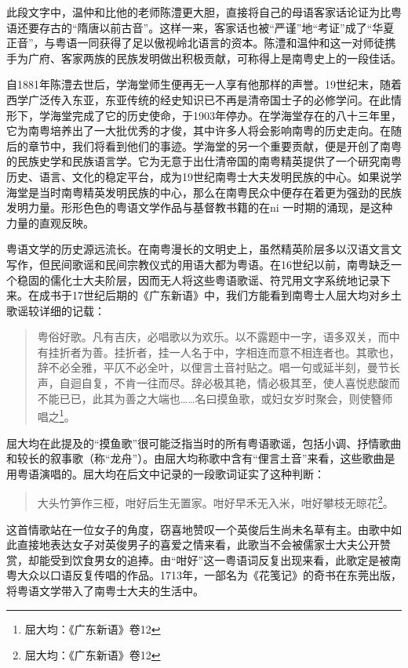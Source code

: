 此段文字中，温仲和比他的老师陈澧更大胆，直接将自己的母语客家话论证为比粤语还要存古的“隋唐以前古音”。这样一来，客家话也被“严谨”地“考证”成了“华夏正音”，与粤语一同获得了足以傲视岭北语言的资本。陈澧和温仲和这一对师徒携手为广府、客家两族的民族发明做出积极贡献，可称得上是南粤史上的一段佳话。

自1881年陈澧去世后，学海堂师生便再无一人享有他那样的声誉。19世纪末，随着西学广泛传入东亚，东亚传统的经史知识已不再是清帝国士子的必修学问。在此情形下，学海堂完成了它的历史使命，于1903年停办。在学海堂存在的八十三年里，它为南粤培养出了一大批优秀的才俊，其中许多人将会影响南粤的历史走向。在随后的章节中，我们将看到他们的事迹。学海堂的另一个重要贡献，便是开创了南粤的民族史学和民族语言学。它为无意于出仕清帝国的南粤精英提供了一个研究南粤历史、语言、文化的稳定平台，成为19世纪南粤士大夫发明民族的中心。如果说学海堂是当时南粤精英发明民族的中心，那么在南粤民众中便存在着更为强劲的民族发明力量。形形色色的粤语文学作品与基督教书籍的在ni 一时期的涌现，是这种力量的直观反映。

粤语文学的历史源远流长。在南粤漫长的文明史上，虽然精英阶层多以汉语文言文写作，但民间歌谣和民间宗教仪式的用语大都为粤语。在16世纪以前，南粤缺乏一个稳固的儒化士大夫阶层，因而无人将这些粤语歌谣、符咒用文字系统地记录下来。在成书于17世纪后期的《广东新语》中，我们方能看到南粤士人屈大均对乡土歌谣较详细的记载：

\begin{quote}

粤俗好歌。凡有吉庆，必唱歌以为欢乐。以不露题中一字，语多双关，而中有挂折者为善。挂折者，挂一人名于中，字相连而意不相连者也。其歌也，辞不必全雅，平仄不必全叶，以俚言土音衬贴之。唱一句或延半刻，曼节长声，自迴自复，不肯一往而尽。辞必极其艳，情必极其至，使人喜悦悲酸而不能已已，此其为善之大端也……名曰摸鱼歌，或妇女岁时聚会，则使簪师唱之\footnote{屈大均：《广东新语》卷12}。
\end{quote}

屈大均在此提及的“摸鱼歌”很可能泛指当时的所有粤语歌谣，包括小调、抒情歌曲和较长的叙事歌（称“龙舟”）。由屈大均称歌中含有“俚言土音”来看，这些歌曲是用粤语演唱的。屈大均在后文中记录的一段歌词证实了这种判断：

\begin{quote}

大头竹笋作三桠，咁好后生无置家。咁好早禾无入米，咁好攀枝无晾花\footnote{屈大均：《广东新语》卷12}。
\end{quote}

这首情歌站在一位女子的角度，窃喜地赞叹一个英俊后生尚未名草有主。由歌中如此直接地表达女子对英俊男子的喜爱之情来看，此歌当不会被儒家士大夫公开赞赏，却能受到饮食男女的追捧。由“咁好”这一粤语词反复出现来看，此歌定是被南粤大众以口语反复传唱的作品。1713年，一部名为《花笺记》的奇书在东莞出版，将粤语文学带入了南粤士大夫的生活中。

